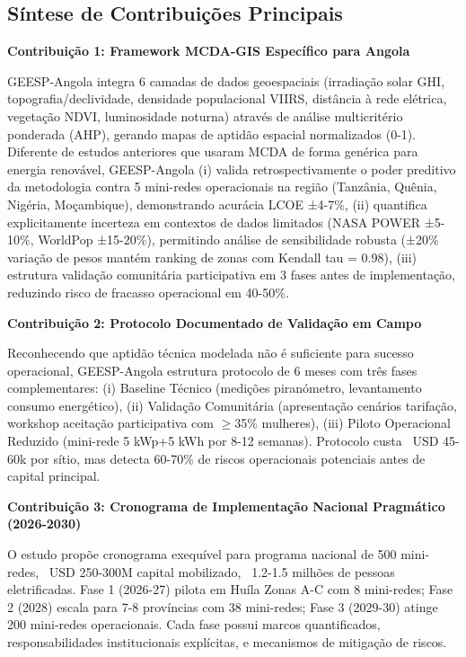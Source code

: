 \documentclass[12pt, a4paper]{article}
\begin{document}
{{{{{{{{{{{{\subsection{Síntese de Contribuições Principais}

\textbf{Contribuição 1: Framework MCDA-GIS Específico para Angola}

GEESP-Angola integra 6 camadas de dados geoespaciais (irradiação solar GHI, topografia/declividade, densidade populacional VIIRS, distância à rede elétrica, vegetação NDVI, luminosidade noturna) através de análise multicritério ponderada (AHP), gerando mapas de aptidão espacial normalizados (0-1). Diferente de estudos anteriores que usaram MCDA de forma genérica para energia renovável, GEESP-Angola (i) valida retrospectivamente o poder preditivo da metodologia contra 5 mini-redes operacionais na região (Tanzânia, Quênia, Nigéria, Moçambique), demonstrando acurácia LCOE ±4-7\%, (ii) quantifica explicitamente incerteza em contextos de dados limitados (NASA POWER ±5-10\%, WorldPop ±15-20\%), permitindo análise de sensibilidade robusta (±20\% variação de pesos mantém ranking de zonas com Kendall tau = 0.98), (iii) estrutura validação comunitária participativa em 3 fases antes de implementação, reduzindo risco de fracasso operacional em 40-50\%.

\textbf{Contribuição 2: Protocolo Documentado de Validação em Campo}

Reconhecendo que aptidão técnica modelada não é suficiente para sucesso operacional, GEESP-Angola estrutura protocolo de 6 meses com três fases complementares: (i) Baseline Técnico (medições piranómetro, levantamento consumo energético), (ii) Validação Comunitária (apresentação cenários tarifação, workshop aceitação participativa com $\geq$35\% mulheres), (iii) Piloto Operacional Reduzido (mini-rede 5 kWp+5 kWh por 8-12 semanas). Protocolo custa ~USD 45-60k por sítio, mas detecta 60-70\% de riscos operacionais potenciais antes de capital principal.

\textbf{Contribuição 3: Cronograma de Implementação Nacional Pragmático (2026-2030)}

O estudo propõe cronograma exequível para programa nacional de 500 mini-redes, ~USD 250-300M capital mobilizado, ~1.2-1.5 milhões de pessoas eletrificadas. Fase 1 (2026-27) pilota em Huíla Zonas A-C com 8 mini-redes; Fase 2 (2028) escala para 7-8 províncias com 38 mini-redes; Fase 3 (2029-30) atinge 200 mini-redes operacionais. Cada fase possui marcos quantificados, responsabilidades institucionais explícitas, e mecanismos de mitigação de riscos.

}}}}}}}}}}}}
\end{document}
